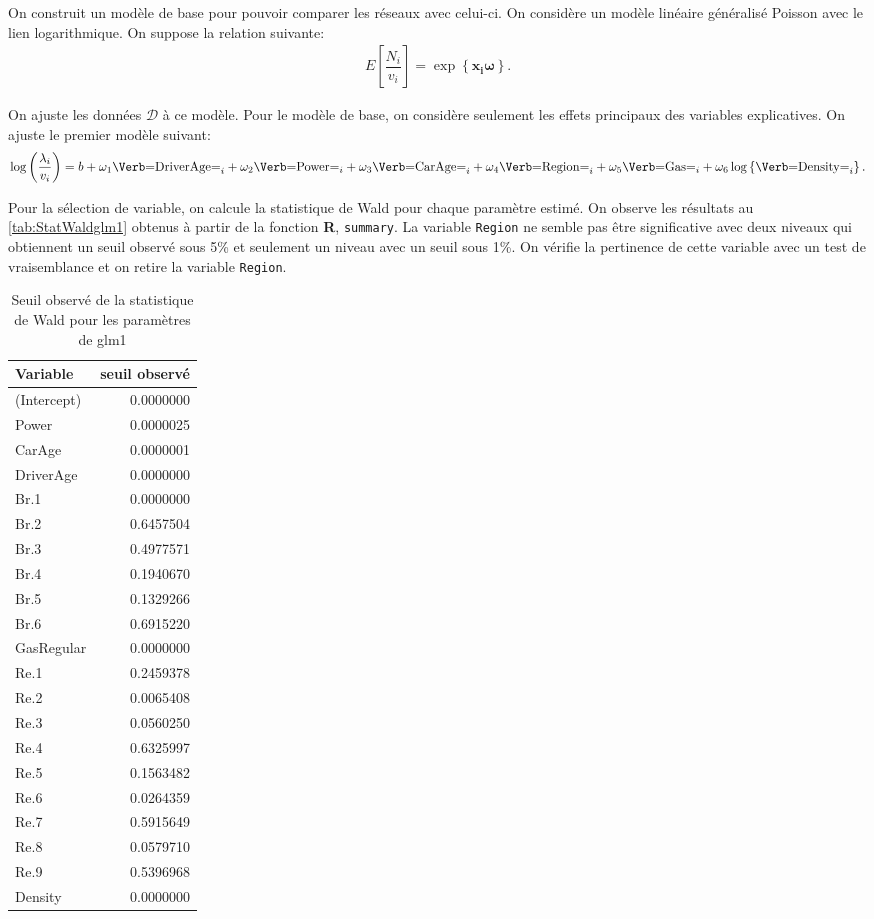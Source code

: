 On construit un modèle de base pour pouvoir comparer les réseaux avec celui-ci. On considère un modèle linéaire généralisé Poisson avec le lien logarithmique. On suppose la relation suivante:
\begin{align*}
E\left[ \dfrac{N_i}{v_i} \right] = \exp\left\{ \mathbf{x_i} \boldsymbol\omega\right\}.
\end{align*}
 

On ajuste les données $\mathcal{D}$ à ce modèle. Pour le modèle de base, on considère seulement les effets principaux des variables explicatives. On ajuste le premier modèle suivant:
\begin{align*}
\log\left(\dfrac{\lambda_i}{v_i}\right) = b+ \omega_1 \text{\Verb=DriverAge=}_i + \omega_2 \text{\Verb=Power=}_i + \omega_3 \text{\Verb=CarAge=}_i + \omega_4 \text{\Verb=Region=}_i + \omega_5 \text{\Verb=Gas=}_i + \omega_6 \log\left\{\text{\Verb=Density=}_i\right\}.
\end{align*}

Pour la sélection de variable, on calcule la statistique de Wald pour chaque paramètre estimé. On observe les résultats au \autoref{tab:StatWaldglm1} obtenus à partir de la fonction \textbf{R}, \verb=summary=. La variable \verb=Region= ne semble pas être significative avec  deux niveaux qui obtiennent un seuil observé sous 5\% et seulement un niveau avec un seuil sous 1\%. On vérifie la pertinence de cette variable avec un test de vraisemblance et on retire la variable \verb=Region=. 

\begin{table}
\centering
\caption{\label{tab:StatWaldglm1} Seuil observé de la statistique de Wald pour les paramètres de glm1}
\begin{tabular}{lr}
\toprule
Variable & seuil observé\\
\midrule
(Intercept) & 0.0000000\\
Power & 0.0000025\\
CarAge & 0.0000001\\
DriverAge & 0.0000000\\
\addlinespace
Br.1 & 0.0000000\\
Br.2 & 0.6457504\\
Br.3 & 0.4977571\\
Br.4 & 0.1940670\\
Br.5 & 0.1329266\\
Br.6 & 0.6915220\\
\addlinespace
GasRegular & 0.0000000\\
Re.1 & 0.2459378\\
Re.2 & 0.0065408\\
Re.3 & 0.0560250\\
Re.4 & 0.6325997\\
\addlinespace
Re.5 & 0.1563482\\
Re.6 & 0.0264359\\
Re.7 & 0.5915649\\
Re.8 & 0.0579710\\
Re.9 & 0.5396968\\
\addlinespace
Density & 0.0000000\\
\bottomrule
\end{tabular}
\end{table}


